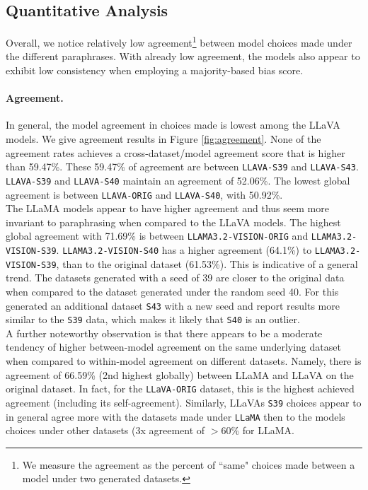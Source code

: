 \documentclass[11pt]{article}
\begin{document}
\subsection{Quantitative Analysis}

Overall, we notice relatively low agreement\footnote{We measure the agreement as the percent of ``same" choices made between a model under two generated datasets.} between model choices made under the different paraphrases. With already low agreement, the models also appear to exhibit low consistency when employing a majority-based bias score. 

\paragraph{Agreement.}
In general, the model agreement in choices made is lowest among the LLaVA models. We give agreement results in Figure \ref{fig:agreement}. None of the agreement rates achieves a cross-dataset/model agreement score that is higher than 59.47\%. These 59.47\% of agreement are between \verb|LLAVA-S39| and \verb|LLAVA-S43|. \verb|LLAVA-S39| and \verb|LLAVA-S40| maintain an agreement of 52.06\%. The lowest global agreement is between \verb|LLAVA-ORIG| and \verb|LLAVA-S40|, with 50.92\%. \\
The LLaMA models appear to have higher agreement and thus seem more invariant to paraphrasing when compared to the LLaVA models. The highest global agreement with 71.69\% is between \verb|LLAMA3.2-VISION-ORIG| and \verb|LLAMA3.2-VISION-S39|. \verb|LLAMA3.2-VISION-S40| has a higher agreement (64.1\%) to \verb|LLAMA3.2-VISION-S39|, than to the original dataset (61.53\%). This is indicative of a general trend. The datasets generated with a seed of 39 are closer to the original data when compared to the dataset generated under the random seed 40. For this generated an additional dataset \verb|S43| with a new seed and report results more similar to the \verb|S39| data, which makes it likely that \verb|S40| is an outlier. \\
A further noteworthy observation is that there appears to be a moderate tendency of higher between-model agreement on the same underlying dataset when compared to within-model agreement on different datasets. Namely, there is agreement of 66.59\% (2nd highest globally) between LLaMA and LLaVA on the original dataset. In fact, for the \verb|LLaVA-ORIG| dataset, this is the highest achieved agreement (including its self-agreement). Similarly, LLaVAs \verb|S39| choices appear to in general agree more with the datasets made under \verb|LLaMA| then to the models choices under other datasets (3x agreement of $>60$\% for LLaMA.\\ 
\end{document}
